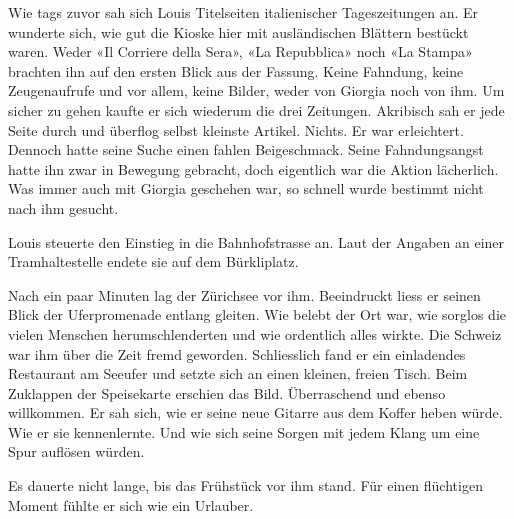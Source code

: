 \sectionbreak

Wie tags zuvor sah sich Louis Titelseiten italienischer 
Tageszeitungen an. Er wunderte sich, wie gut die Kioske hier mit ausländischen Blättern bestückt waren. Weder «Il Corriere della Sera», «La Repubblica» 
noch «La Stampa» brachten ihn auf den ersten Blick aus der Fassung. Keine Fahndung, keine Zeugenaufrufe und vor allem, keine Bilder, weder von Giorgia noch von
ihm. Um sicher zu gehen kaufte er sich wiederum die drei Zeitungen. Akribisch sah er jede Seite durch und überflog selbst kleinste Artikel. Nichts. Er war erleichtert. Dennoch hatte seine Suche einen fahlen Beigeschmack. Seine Fahndungsangst hatte ihn zwar in Bewegung gebracht, doch eigentlich war die Aktion lächerlich. Was immer auch mit Giorgia geschehen war, so schnell wurde bestimmt nicht nach ihm gesucht. 

Louis steuerte den Einstieg in die Bahnhofstrasse an. Laut der Angaben an einer
Tramhaltestelle endete sie auf dem Bürkliplatz.

Nach ein paar Minuten lag der Zürichsee vor ihm. Beeindruckt liess er seinen Blick der Uferpromenade entlang gleiten. 
Wie belebt der Ort war, wie sorglos die vielen Menschen herumschlenderten und wie ordentlich alles wirkte.
Die Schweiz war ihm über die Zeit fremd geworden.
Schliesslich fand er ein einladendes Restaurant am Seeufer und setzte sich an einen kleinen,
freien Tisch. 
Beim Zuklappen der Speisekarte erschien das Bild. Überraschend und
ebenso willkommen. Er sah sich, wie er seine neue Gitarre aus
dem Koffer heben würde. Wie er sie kennenlernte. Und wie sich seine Sorgen mit jedem Klang um eine Spur auflösen würden.

Es dauerte nicht lange, bis das Frühstück vor ihm stand. Für einen flüchtigen
Moment fühlte er sich wie ein Urlauber.

